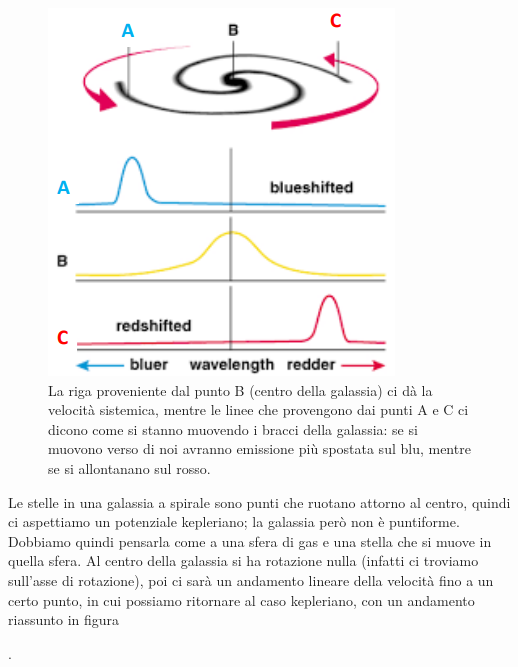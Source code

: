 \begin{figure}
    \centering
    \includegraphics[width = 0.4 \textwidth]{immagini/effetto-doppler.png}
    \caption{La riga proveniente dal punto B (centro della galassia) ci dà la velocità sistemica, mentre le linee che provengono dai punti A e C ci dicono come si stanno muovendo i bracci della galassia: se si muovono verso di noi avranno emissione più spostata sul blu, mentre se si allontanano sul rosso.}
    \label{fig:effetto-doppler-galassie}
\end{figure}

Le stelle in una galassia a spirale sono punti che ruotano attorno al centro, quindi  ci aspettiamo un potenziale kepleriano; la galassia però non è puntiforme. Dobbiamo quindi pensarla come a una sfera di gas e una stella che si muove in quella sfera. Al centro della galassia si ha rotazione nulla (infatti ci troviamo sull'asse di rotazione), poi ci sarà un andamento lineare della velocità fino a un certo punto, in cui possiamo ritornare al caso kepleriano, con un andamento riassunto in figura . 


